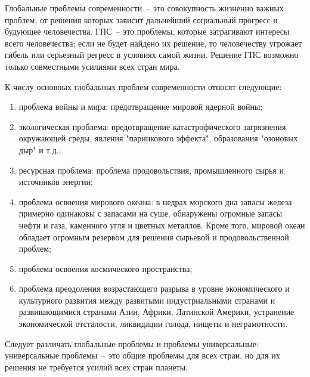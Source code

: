Глобальные проблемы современности~-- это совокупность жизненно важных проблем, от решения
которых зависит дальнейший социальный прогресс и будующее человечества. ГПС~-- это
проблемы, которые затрагивают интересы всего человечества; если не будет найдено их
решение, то человечеству угрожает гибель или серьезный регресс в условиях самой жизни.
Решение ГПС возможно только совместными усилиями всех стран мира. 

К числу основных глобальных проблем современности относят следующие:
\begin{enumerate}
    \item проблема войны и мира: предотвращение мировой ядерной войны;
    \item экологическая проблема: предотвращение катастрофического загрязнения окружающей
        среды, явления "парникового эффекта", образования "озоновых дыр" и т.д.;
    \item ресурсная проблема: проблема продовольствия, промышленного сырья и источников
        энергии;
    \item проблема освоения мирового океана: в недрах морского дна запасы железа примерно
        одинаковы с запасами на суше, обнаружены огромные запасы нефти и газа, каменного
        угля и цветных металлов. Кроме того, мировой океан обладает огромным резервом для
        решения сырьевой и продовольственной проблем;
    \item проблема освоения космического пространства;
    \item проблема преодоления возрастающего разрыва в уровне экономического и культурного
        развития между развитыми индустриальными странами и развивающимися странами Азии,
        Африки, Латинской Америки, устранение экономической отсталости, ликвидации голода,
        нищеты и неграмотности. 
\end{enumerate}

Следует различать глобальные проблемы и проблемы универсальные: универсальные проблемы~--
это общие проблемы для всех стран, но для их решения не требуется усилий всех стран планеты.

